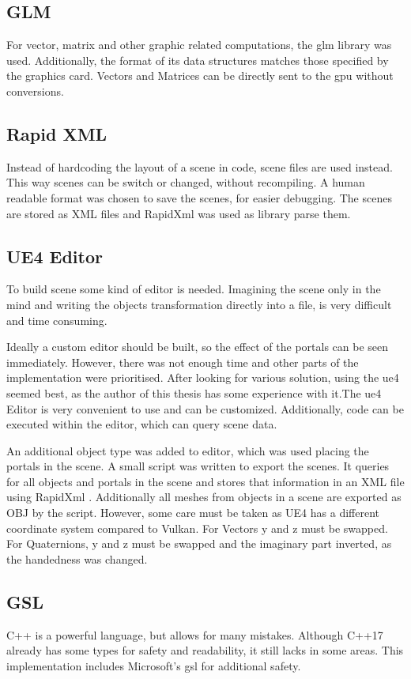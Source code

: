 \subsection{GLM}
For vector, matrix and other graphic related computations, the \gls{glm} library \cite{glm} was used. Additionally, the format of its data structures matches those specified by the graphics card. Vectors and Matrices can be directly sent to the \gls{gpu} without conversions.


\subsection{Rapid XML}
Instead of hardcoding the layout of a scene in code, scene files are used instead. This way scenes can be switch or changed, without recompiling. A human readable format was chosen to save the scenes, for easier debugging. The scenes are stored as XML files and RapidXml \cite{rapidxml} was used as library parse them.

\subsection{UE4 Editor}
To build scene some kind of editor is needed. Imagining the scene only in the mind and writing the objects transformation directly into a file, is very difficult and time consuming.

Ideally a custom editor should be built, so the effect of the portals can be seen immediately. However, there was not enough time and other parts of the implementation were prioritised. After looking for various solution, using the \gls{ue4} \cite{ue4} seemed best, as the author of this thesis has some experience with it.The \gls{ue4} Editor is very convenient to use and can be customized. Additionally, code can be executed within the editor, which can query scene data.

An additional object type was added to editor, which was used placing the portals in the scene. A small script was written to export the scenes. It queries for all objects and portals in the scene and stores that information in an XML file using RapidXml \cite{rapidxml}. Additionally all meshes from objects in a scene are exported as OBJ by the script. However, some care must be taken as UE4 has a different coordinate system compared to Vulkan. For Vectors y and z must be swapped. For Quaternions, y and z must be swapped and the imaginary part inverted, as the handedness was changed.

\subsection{GSL}
C++ is a powerful language, but allows for many mistakes. Although C++17 already has some types for safety and readability, it still lacks in some areas. This implementation includes Microsoft's \gls{gsl} \cite{microsoft:gsl} for additional safety.


